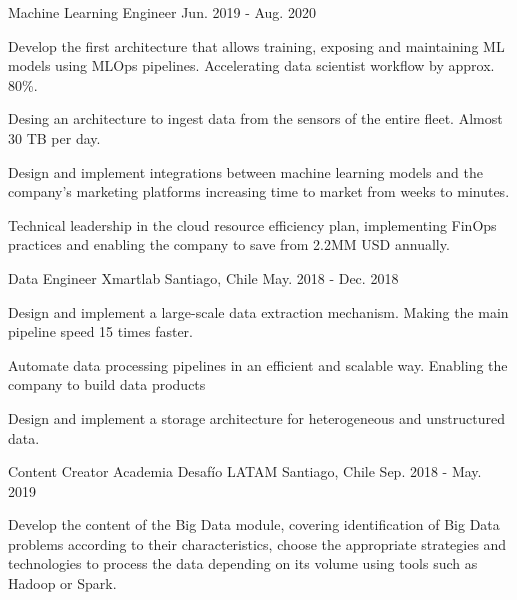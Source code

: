 \begin{cventries}
  \cventry
    {Machine Learning Engineer} %
    {} %
    {} %
    {Jun. 2019 - Aug. 2020} %
    {
    \begin{cvitems} %
      \item {Develop the first architecture that allows training, exposing and maintaining ML models using MLOps pipelines. Accelerating data scientist workflow by approx. 80\%.}
      \item {Desing an architecture to ingest data from the sensors of the entire fleet. Almost 30 TB per day.}
      \item {Design and implement integrations between machine learning models and the company's marketing platforms increasing time to market from weeks to minutes.}
      \item {Technical leadership in the cloud resource efficiency plan, implementing FinOps practices and enabling the company to save from 2.2MM USD annually.}
    \end{cvitems}
    }

  \cventry
    {Data Engineer} %
    {Xmartlab} %
    {Santiago, Chile} %
    {May. 2018 - Dec. 2018} %
    {
      \begin{cvitems} %
        \item {Design and implement a large-scale data extraction mechanism. Making the main pipeline speed 15 times faster.}
        \item {Automate data processing pipelines in an efficient and scalable way. Enabling the company to build data products }
        \item {Design and implement a storage architecture for heterogeneous and unstructured data.}
      \end{cvitems}
    }

\cventry
  {Content Creator} %
  {Academia Desafío LATAM} %
  {Santiago, Chile} %
  {Sep. 2018 - May. 2019} %
  {
    \begin{cvitems} %
      \item {Develop the content of the Big Data module, covering identification of Big Data problems according to their characteristics, choose the appropriate strategies and technologies to process the data depending on its volume using tools such as Hadoop or Spark.}
    \end{cvitems}
  }


\end{cventries}
